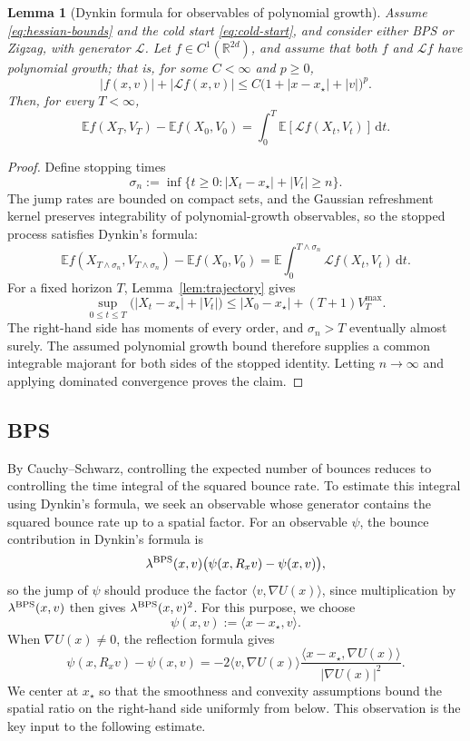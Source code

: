 \documentclass{amsart}
\theoremstyle{plain}
\newtheorem{lemma}[theorem]{Lemma}      %
\theoremstyle{definition}
\theoremstyle{remark}
\newcommand{\ud}{\,\mathrm{d}}
\newcommand{\EE}{\mathbb{E}}
\newcommand{\abs}[1]{\lvert#1\rvert}
\newcommand{\E}{\EE}
\newcommand{\1}{\mathbf 1}
\newcommand{\dd}{\ud}
\newcommand{\ip}[2]{\langle #1,#2\rangle}
\newcommand{\bps}{{\rm BPS}}
\begin{document}
\begin{lemma}[Dynkin formula for observables of polynomial growth]
\label{lem:dynkin-polynomial}
Assume \eqref{eq:hessian-bounds} and the cold start
\eqref{eq:cold-start}, and consider either BPS or Zigzag, with generator
$\mathcal L$.  Let $f\in C^1(\mathbb R^{2d})$, and assume that both $f$ and $\mathcal Lf$ have polynomial growth; that is, for some $C<\infty$ and $p\ge0$,
\[
        \abs{f(x,v)}+\abs{\mathcal Lf(x,v)}
        \le C\bigl(1+\abs{x-x_\star}+\abs v\bigr)^p.
\]
Then, for every $T<\infty$,
\[
        \E f(X_T,V_T)-\E f(X_0,V_0)
        =\int_0^T\E[\mathcal Lf(X_t,V_t)]\dd t.
\]
\end{lemma}

\begin{proof}
Define stopping times
\[
        \sigma_n:=\inf\{t\ge0:
        \abs{X_t-x_\star}+\abs{V_t}\ge n\}.
\]
The jump rates are bounded on compact sets, and the Gaussian refreshment kernel preserves integrability of polynomial-growth observables, so the stopped process satisfies
Dynkin's formula:
\[
        \E f(X_{T\wedge\sigma_n},V_{T\wedge\sigma_n})
        -\E f(X_0,V_0)
        =\E\int_0^{T\wedge\sigma_n}
          \mathcal Lf(X_t,V_t)\dd t.
\]
For a fixed horizon $T$, Lemma~\ref{lem:trajectory} gives
\[
        \sup_{0\le t\le T}
        \bigl(\abs{X_t-x_\star}+\abs{V_t}\bigr)
        \le \abs{X_0-x_\star}+(T+1)V_T^{\max}.
\]
The right-hand side has moments of every order, and $\sigma_n>T$ eventually
almost surely.  The assumed polynomial growth bound therefore supplies a common
integrable majorant for both sides of the stopped identity.  Letting
$n\to\infty$ and applying dominated convergence proves the claim.
\end{proof}

\subsection{BPS}\label{ssec:proof-bps}

By Cauchy--Schwarz, controlling the expected number of bounces reduces to
controlling the time integral of the squared bounce rate.  To estimate this
integral using Dynkin's formula, we seek an observable whose generator
contains the squared bounce rate up to a spatial factor.  For an observable
$\psi$, the bounce contribution in Dynkin's formula is
\[
        \lambda^{\bps}(x,v)
        \bigl(\psi(x,R_xv)-\psi(x,v)\bigr),
\]
so the jump of $\psi$ should produce the factor
$\ip{v}{\nabla U(x)}$, since multiplication by $\lambda^{\bps}(x,v)$
then gives $\lambda^{\bps}(x,v)^2$.
For this purpose, we choose
\[
        \psi(x,v):=\ip{x-x_\star}{v}.
\]
When $\nabla U(x)\ne0$, the reflection formula gives
\begin{equation}\label{eq:bps-motivating-jump}
        \psi(x,R_xv)-\psi(x,v)
        =-2\ip{v}{\nabla U(x)}
          \frac{\ip{x-x_\star}{\nabla U(x)}}
               {\abs{\nabla U(x)}^2}.
\end{equation}
We center at $x_\star$ so that the smoothness and convexity assumptions bound
the spatial ratio on the right-hand side uniformly from below.  This
observation is the key input to the following estimate.
\end{document}
